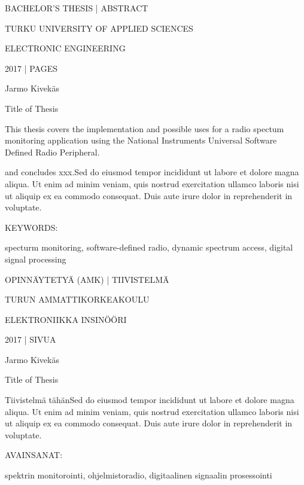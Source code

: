 BACHELOR'S THESIS | ABSTRACT

TURKU UNIVERSITY OF APPLIED SCIENCES

ELECTRONIC ENGINEERING

2017 | \pageref{LastPage} PAGES


\vspace{10mm}
{\Large Jarmo Kivekäs \par}

\vspace{10mm}
{\huge Title of Thesis \par}

\vspace{10mm}

This thesis covers the implementation and possible uses for a radio spectum monitoring
application using the National Instruments Universal Software Defined Radio Peripheral.

and concludes xxx.Sed do eiusmod tempor
incididunt ut labore et dolore magna aliqua. Ut enim ad minim veniam,
quis nostrud exercitation ullamco laboris nisi ut aliquip ex ea commodo
consequat. Duis aute irure dolor in reprehenderit in voluptate.

\vspace{30mm}

KEYWORDS:

specturm monitoring, software-defined radio, dynamic spectrum access, digital signal processing



\clearpage


OPINNÄYTETYÄ (AMK) | TIIVISTELMÄ

TURUN AMMATTIKORKEAKOULU

ELEKTRONIIKKA INSINÖÖRI

2017 | \pageref{LastPage} SIVUA


\vspace{10mm}
{\Large Jarmo Kivekäs \par}

\vspace{10mm}
{\huge Title of Thesis \par}

\vspace{10mm}

Tiivistelmä tähänSed do eiusmod tempor
incididunt ut labore et dolore magna aliqua. Ut enim ad minim veniam,
quis nostrud exercitation ullamco laboris nisi ut aliquip ex ea commodo
consequat. Duis aute irure dolor in reprehenderit in voluptate.

\vspace{30mm}

AVAINSANAT:

spektrin monitorointi, ohjelmistoradio, digitaalinen signaalin prosessointi
